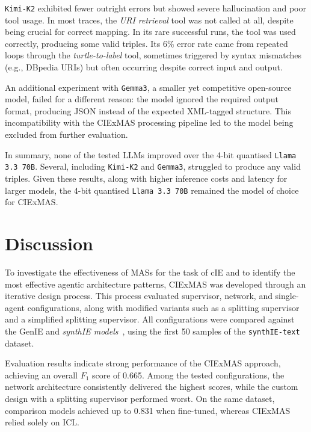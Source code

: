 \documentclass[a4paper,oneside,bibliography=totoc]{scrbook}
\begin{document}
\texttt{Kimi-K2} exhibited fewer outright errors but showed severe hallucination and poor tool usage. In most traces, the \textit{URI retrieval} tool was not called at all, despite being crucial for correct mapping. In its rare successful runs, the tool was used correctly, producing some valid triples. Its 6\% error rate came from repeated loops through the \textit{turtle-to-label} tool, sometimes triggered by syntax mismatches (e.g., DBpedia URIs) but often occurring despite correct input and output.

An additional experiment with \texttt{Gemma3}, a smaller yet competitive open-source model, failed for a different reason: the model ignored the required output format, producing JSON instead of the expected XML-tagged structure. This incompatibility with the CIExMAS processing pipeline led to the model being excluded from further evaluation.

In summary, none of the tested \acp{LLM} improved over the 4-bit quantised \texttt{Llama 3.3 70B}. Several, including \texttt{Kimi-K2} and \texttt{Gemma3}, struggled to produce any valid triples. Given these results, along with higher inference costs and latency for larger models, the 4-bit quantised \texttt{Llama 3.3 70B} remained the model of choice for CIExMAS.

\section{Discussion}
\label{sec:discussion}

To investigate the effectiveness of \acp{MAS} for the task of \ac{cIE} and to identify the most effective agentic architecture patterns, CIExMAS was developed through an iterative design process. This process evaluated supervisor, network, and single-agent configurations, along with modified variants such as a splitting supervisor and a simplified splitting supervisor. All configurations were compared against the GenIE and \textit{synthIE models}~\cite{Josifoski2021,Josifoski2023}, using the first 50 samples of the \texttt{synthIE-text} dataset.

Evaluation results indicate strong performance of the CIExMAS approach, achieving an overall $F_{1}$ score of 0.665. Among the tested configurations, the network architecture consistently delivered the highest scores, while the custom design with a splitting supervisor performed worst. On the same dataset, comparison models achieved up to 0.831 when fine-tuned, whereas CIExMAS relied solely on \ac{ICL}.
\end{document}
